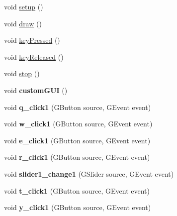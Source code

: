 \begin{DoxyCompactItemize}
\item 
void \hyperlink{classkeyplayer_a0b7282386790ccfe8ca8fec9ba8b7e69}{setup} ()
\item 
void \hyperlink{classkeyplayer_a1e09a6adb89438a2ee315bef66d319e0}{draw} ()
\item 
void \hyperlink{classkeyplayer_a4845b0307a73147593abef0fecc182cd}{key\+Pressed} ()
\item 
void \hyperlink{classkeyplayer_ab22ee713ccbfff359e1c47fc190828f4}{key\+Released} ()
\item 
void \hyperlink{classkeyplayer_adae4a03190615d6f7c092f88ef61b7c5}{stop} ()
\item 
\hypertarget{classkeyplayer_adc4853d219c900ab0b1437cf6c672238}{void {\bfseries custom\+G\+U\+I} ()}\label{classkeyplayer_adc4853d219c900ab0b1437cf6c672238}

\item 
\hypertarget{classkeyplayer_a56dada7e8df126d317be2cadaf82a0b4}{void {\bfseries q\+\_\+click1} (G\+Button source, G\+Event event)}\label{classkeyplayer_a56dada7e8df126d317be2cadaf82a0b4}

\item 
\hypertarget{classkeyplayer_a3fd6957d08db95374cf73f9f28145673}{void {\bfseries w\+\_\+click1} (G\+Button source, G\+Event event)}\label{classkeyplayer_a3fd6957d08db95374cf73f9f28145673}

\item 
\hypertarget{classkeyplayer_ab8bfc95261953068b81ff477a268eba8}{void {\bfseries e\+\_\+click1} (G\+Button source, G\+Event event)}\label{classkeyplayer_ab8bfc95261953068b81ff477a268eba8}

\item 
\hypertarget{classkeyplayer_a055bd941463df838049b07734fde8742}{void {\bfseries r\+\_\+click1} (G\+Button source, G\+Event event)}\label{classkeyplayer_a055bd941463df838049b07734fde8742}

\item 
\hypertarget{classkeyplayer_a62167d49a9cc87a8166c311f6e783399}{void {\bfseries slider1\+\_\+change1} (G\+Slider source, G\+Event event)}\label{classkeyplayer_a62167d49a9cc87a8166c311f6e783399}

\item 
\hypertarget{classkeyplayer_aadd83307147b9e4920ed54ea2d11db92}{void {\bfseries t\+\_\+click1} (G\+Button source, G\+Event event)}\label{classkeyplayer_aadd83307147b9e4920ed54ea2d11db92}

\item 
\hypertarget{classkeyplayer_a97b8904a6c9400e5ea09e23df2cdb8c1}{void {\bfseries y\+\_\+click1} (G\+Button source, G\+Event event)}\label{classkeyplayer_a97b8904a6c9400e5ea09e23df2cdb8c1}


\end{DoxyCompactItemize}
